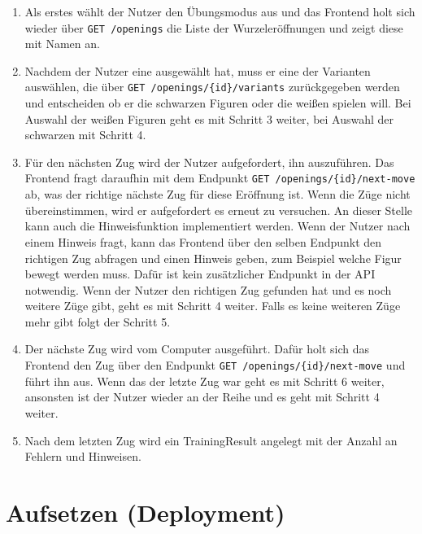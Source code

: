 \begin{enumerate}
    \item Als erstes wählt der Nutzer den Übungsmodus aus und das Frontend holt sich wieder über \lstinline{GET /openings} die Liste der Wurzeleröffnungen und zeigt diese mit Namen an.
    \item Nachdem der Nutzer eine ausgewählt hat, muss er eine der Varianten auswählen, die über \lstinline|GET /openings/{id}/variants| zurückgegeben werden und entscheiden ob er die schwarzen Figuren oder die weißen spielen will. Bei Auswahl der weißen Figuren geht es mit Schritt 3 weiter, bei Auswahl der schwarzen mit Schritt 4.
    \item Für den nächsten Zug wird der Nutzer aufgefordert, ihn auszuführen. Das Frontend fragt daraufhin mit dem Endpunkt \lstinline|GET /openings/{id}/next-move| ab, was der richtige nächste Zug für diese Eröffnung ist. Wenn die Züge nicht übereinstimmen, wird er aufgefordert es erneut zu versuchen. An dieser Stelle kann auch die Hinweisfunktion implementiert werden. Wenn der Nutzer nach einem Hinweis fragt, kann das Frontend über den selben Endpunkt den richtigen Zug abfragen und einen Hinweis geben, zum Beispiel welche Figur bewegt werden muss. Dafür ist kein zusätzlicher Endpunkt in der API notwendig. Wenn der Nutzer den richtigen Zug gefunden hat und es noch weitere Züge gibt, geht es mit Schritt 4 weiter. Falls es keine weiteren Züge mehr gibt folgt der Schritt 5.
    \item Der nächste Zug wird vom Computer ausgeführt. Dafür holt sich das Frontend den Zug über den Endpunkt \lstinline|GET /openings/{id}/next-move| und führt ihn aus. Wenn das der letzte Zug war geht es mit Schritt 6 weiter, ansonsten ist der Nutzer wieder an der Reihe und es geht mit Schritt 4 weiter.
    \item Nach dem letzten Zug wird ein TrainingResult angelegt mit der Anzahl an Fehlern und Hinweisen. 
\end{enumerate}



\section{Aufsetzen (Deployment)}
